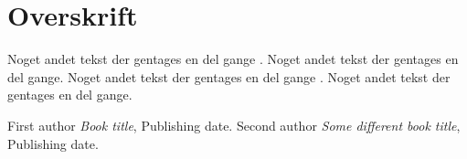 \documentclass{article}
\begin{document}
\section{Overskrift}
Noget andet tekst der gentages en del gange
\cite{Reference}.
Noget andet tekst der gentages en del gange.
Noget andet tekst der gentages en del gange
\cite{AnotherRef}.
Noget andet tekst der gentages en del gange.

\begin{thebibliography}{99}
 First author
 {\it Book title},
 Publishing date.
 Second author
 {\it Some different book title},
 Publishing date.
\end{thebibliography}
\end{document}
